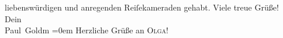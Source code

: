 \begin{ledgroupsized}[t]{13cm}
               liebenswürdigen und anregenden Reiſekameraden gehabt.\pend
           \pstart
           Viele treue Grüße! {\\[\baselineskip]}Dein {\\[\baselineskip]}\spacefill\mbox{Paul Goldm}\pend
           \leftskip=0em{}\pstart
           \noindent{}Herzliche Grüße an \textsc{Olga}!\pend
           
         
         \endnumbering{}\end{ledgroupsized}  \newcommand{\dateiname}{L03222}\newcommand{\titel}{Paul Goldmann an Arthur Schnitzler, 1. 9. [1902]}\newcommand{\editorInnen}{Martin Anton Müller und Laura Untner}
      
